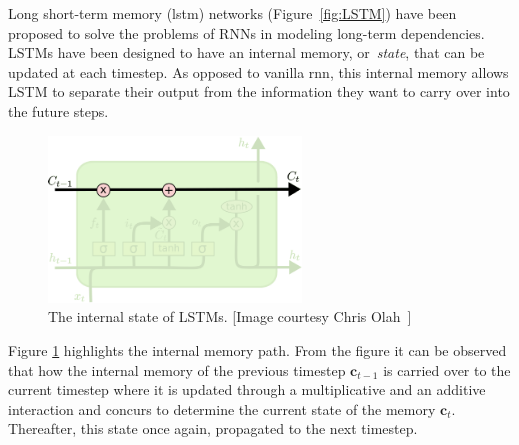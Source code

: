 Long short-term memory (\gls{lstm}) networks (Figure~\ref{fig:LSTM}) have been proposed to solve the problems of RNNs in modeling long-term dependencies. LSTMs have been designed to have an internal memory, or~\emph{state}, that can be updated at each timestep. As opposed to vanilla \gls{rnn}, this internal memory allows LSTM to separate their output from the information they want to carry over into the future steps.

\begin{figure}[t]
	\centering
	\includegraphics[width=0.6\textwidth]{figures/LSTM_state.pdf}
	\caption[The internal state of LSTMs]
	{The internal state of LSTMs. [Image courtesy Chris Olah~\cite{colah_15}]\label{fig:LSTM_state}}
\end{figure}

Figure \ref{fig:LSTM_state} highlights the internal memory path. From the figure it can be observed that how the internal memory of the previous timestep $\mathbf{c}_{t-1}$ is carried over to the current timestep where it is updated through a multiplicative and an additive interaction and concurs to determine the current state of the memory $\textbf{c}_t$. Thereafter, this state once again, propagated to the next timestep.


